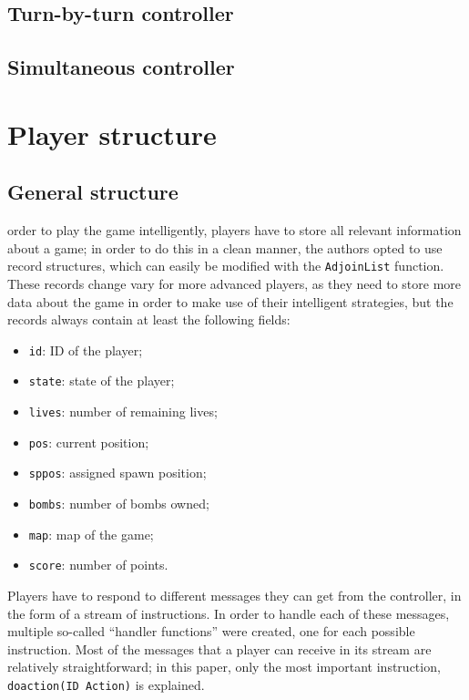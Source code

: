 \documentclass[12pt,journal]{IEEEtran}
\begin{document}
\subsection{Turn-by-turn controller}

\subsection{Simultaneous controller}

\section{Player structure}

\subsection{General structure}
 order to play the game intelligently, players have to store all relevant information about a game; in order to do this in a clean manner, the authors opted to use record structures, which can easily be modified with the \lstinline|AdjoinList| function.
These records change vary for more advanced players, as they need to store more data about the game in order to make use of their intelligent strategies, but the records always contain at least the following fields:
\begin{itemize}
	\item \lstinline|id|: ID of the player;
	\item \lstinline|state|: state of the player;
	\item \lstinline|lives|: number of remaining lives;
	\item \lstinline|pos|: current position;
	\item \lstinline|sppos|: assigned spawn position;
	\item \lstinline|bombs|: number of bombs owned;
	\item \lstinline|map|: map of the game;
	\item \lstinline|score|: number of points.
\end{itemize}

Players have to respond to different messages they can get from the controller, in the form of a stream of instructions.
In order to handle each of these messages, multiple so-called ``handler functions'' were created, one for each possible instruction.
Most of the messages that a player can receive in its stream are relatively straightforward; in this paper, only the most important instruction, \lstinline|doaction(ID Action)| is explained.
\end{document}
